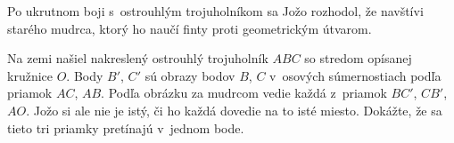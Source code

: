 \createTaskHeader
Po ukrutnom boji s~ostrouhlým trojuholníkom sa Jožo rozhodol, že navštívi starého mudrca, ktorý ho naučí finty proti geometrickým útvarom.

Na zemi našiel nakreslený ostrouhlý trojuholník $ABC$ so stredom opísanej kružnice $O$. Body $B'$, $C'$ sú obrazy
bodov $B$, $C$ v~osových súmernostiach podľa priamok $AC$, $AB$. Podľa obrázku za mudrcom vedie každá z~priamok
$BC'$, $CB'$, $AO$. Jožo si ale nie je istý, či ho každá dovedie na to isté miesto. Dokážte, že sa tieto tri priamky
pretínajú v~jednom bode.
